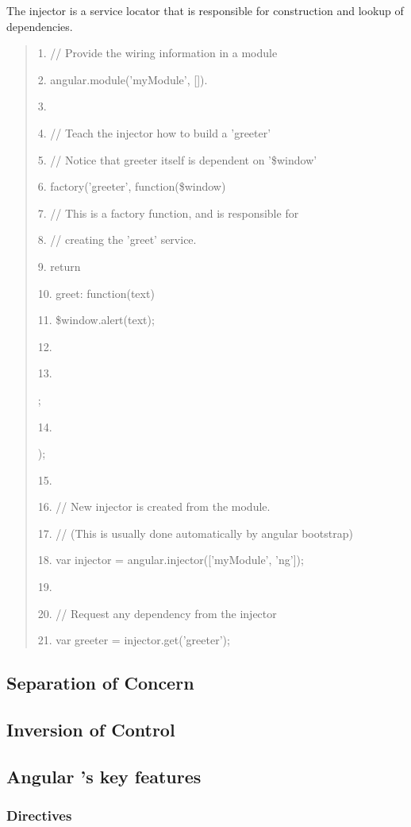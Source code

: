 \documentclass[14pt,a4paper]{extreport}
\begin{document}
The injector is a service locator that is responsible for construction and lookup of dependencies.
\begin{verse}


1. // Provide the wiring information in a module

2. angular.module('myModule', []).

3. 

4. // Teach the injector how to build a 'greeter'

5. // Notice that greeter itself is dependent on '\$window'

6. factory('greeter', function(\$window) {

7. // This is a factory function, and is responsible for 

8. // creating the 'greet' service.

9. return {

10. greet: function(text) {

11. \$window.alert(text);

12. }

13. };

14. });

15. 

16. // New injector is created from the module. 

17. // (This is usually done automatically by angular bootstrap)

18. var injector = angular.injector(['myModule', 'ng']);

19. 

20. // Request any dependency from the injector

21. var greeter = injector.get('greeter');
			\end{verse}

		\subsection{Separation of Concern}
		\subsection{Inversion of Control}

			
		\subsection{Angular 's key features}
			\subsubsection{Directives}
\end{document}
